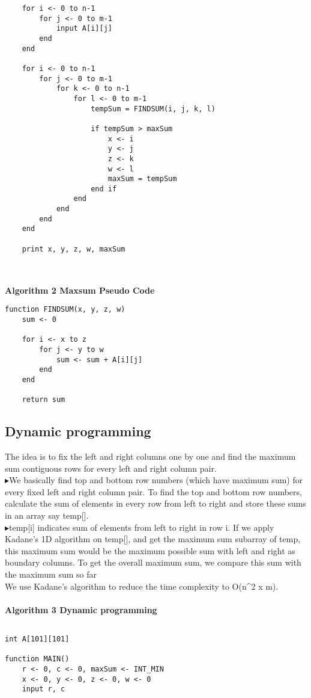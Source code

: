 \documentclass[12pt, a4paper]{report}
\begin{document}
\begin{multicols}{2}
\begin{lstlisting}
	for i <- 0 to n-1
		for j <- 0 to m-1
			input A[i][j]
		end
	end

	for i <- 0 to n-1
		for j <- 0 to m-1
			for k <- 0 to n-1
				for l <- 0 to m-1
					tempSum = FINDSUM(i, j, k, l)

					if tempSum > maxSum
						x <- i
						y <- j
						z <- k
						w <- l
						maxSum = tempSum
					end if
				end
			end
		end
	end

	print x, y, z, w, maxSum


\end{lstlisting}
\hline\\
\textbf{Algorithm 2 Maxsum Pseudo Code}

\begin{lstlisting}
function FINDSUM(x, y, z, w)
	sum <- 0

	for i <- x to z
		for j <- y to w
			sum <- sum + A[i][j]
		end
	end

	return sum

\end{lstlisting}


\subsection{Dynamic programming}


The idea is to fix the left and right columns one by one and find the maximum sum
contiguous rows for every left and right column pair.\\
▸We basically find top and bottom row numbers (which have maximum sum) for every
fixed left and right column pair. To find the top and bottom row numbers, calculate the sum of elements in every row from left to right and store these sums in an array say temp[].\\
▸temp[i] indicates sum of elements from left to right in row i. If we apply Kadane’s 1D
algorithm on temp[], and get the maximum sum subarray of temp, this maximum sum
would be the maximum possible sum with left and right as boundary columns. To get
the overall maximum sum, we compare this sum with the maximum sum so far\\
We use Kadane’s algorithm to reduce the time complexity to O(n^2 x m).\\
\hline\\

\textbf{Algorithm 3 Dynamic programming }
\begin{lstlisting}

int A[101][101]

function MAIN()
	r <- 0, c <- 0, maxSum <- INT_MIN
	x <- 0, y <- 0, z <- 0, w <- 0
	input r, c


\end{lstlisting}
\end{multicols}
\end{document}
